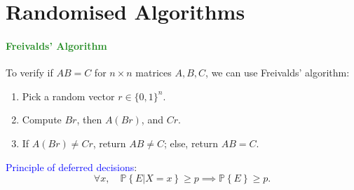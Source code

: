 \section{Randomised Algorithms}
\paragraph{\textcolor{ForestGreen}{Freivalds' Algorithm}}
To verify if $AB=C$ for $n\times n$ matrices $A,B,C$, we can use Freivalds' algorithm:
\begin{enumerate}
  \item Pick a random vector $r\in \{0,1\}^n$.
  \item Compute $Br$, then $A(Br)$, and $Cr$.
  \item If $A(Br)\neq Cr$, return $AB\neq C$; else, return $AB=C$.
\end{enumerate}
\textcolor{Blue}{Principle of deferred decisions}:
\[\forall x,\quad \mathbb{P}\left\{ E | X = x \right\} \ge p\implies\mathbb{P}\left\{ E \right\} \ge p.\] 
